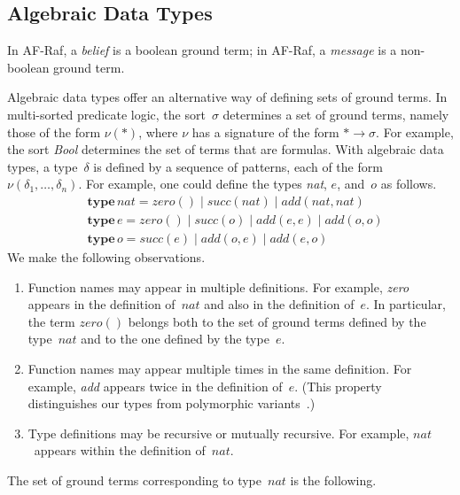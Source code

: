 \documentclass[a4paper,12pt,oneside,fleqn]{book} %
\newcommand{\rg}[1]{\marginpar{\tiny\raggedright\textcolor{blue}{\bf rg:} #1}}
\renewcommand{\rg}{}
\begin{document}
\subsection{Algebraic Data Types} %

In AF-Raf, a \emph{belief} is a boolean ground term; in AF-Raf, a
\emph{message} is a non-boolean ground term.

Algebraic data types offer an alternative way of defining sets of ground
terms. In multi-sorted predicate logic, the sort~$\sigma$ determines a set
of ground terms, namely those of the form $\nu(*)$, where $\nu$ has a
signature of the form $*\to\sigma$.  For example, the sort \textit{Bool}
determines the set of terms that are formulas.  With algebraic data types,
a type~$\delta$ is defined by a sequence of patterns, each of the form
$\nu(\delta_1,\ldots,\delta_n)$. For example, one could define the types
\textit{nat}, $e$, and~$o$ as follows.
\begin{align}
&\mathbf{type}\,\mathit{nat} =
      \mathit{zero}()
  \mid\mathit{succ}(\mathit{nat})
  \mid\mathit{add}(\mathit{nat},\mathit{nat}) \\
&\mathbf{type}\,e =
      \mathit{zero}()
  \mid\mathit{succ}(o)
  \mid\mathit{add}(e,e)
  \mid\mathit{add}(o,o) \\
&\mathbf{type}\,o =
      \mathit{succ}(e)
  \mid\mathit{add}(o,e)
  \mid\mathit{add}(e,o)
\end{align}
We make the following observations.
\begin{enumerate}
\item
  Function names may appear in multiple definitions. For example,
  \textit{zero} appears in the definition of~$\mathit{nat}$ and also in the
  definition of~$e$. In particular, the term $\mathit{zero}()$ belongs both
  to the set of ground terms defined by the type~$\mathit{nat}$ and to the
  one defined by the type~$e$.
\item
  Function names may appear multiple times in the same definition. For
  example, \textit{add} appears twice in the definition of~$e$. (This
  property distinguishes our types from polymorphic
  variants~\cite{garrigue1998}.)
\item
  Type definitions may be recursive or mutually recursive. For example,
  $\mathit{nat}$~appears within the definition of~$\mathit{nat}$.
\end{enumerate}
The set of ground terms corresponding to type~$\mathit{nat}$ is the following.
\end{document}
